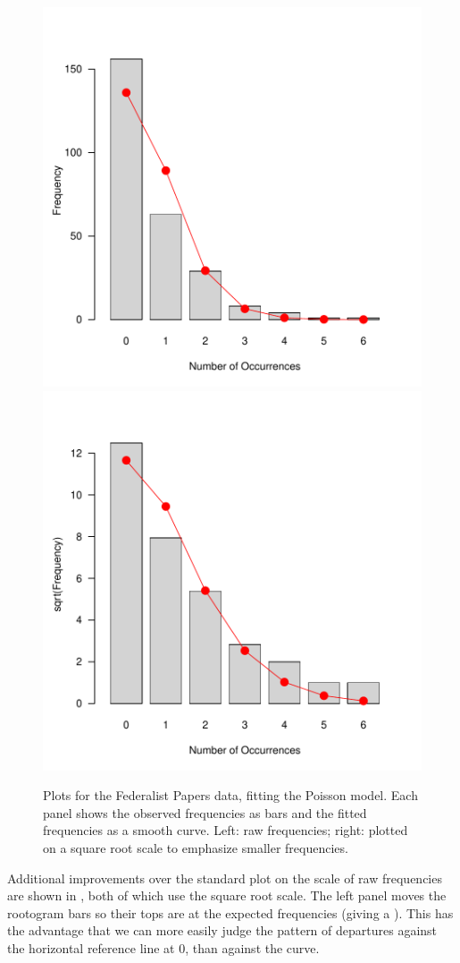 \documentclass[11pt]{book}
\renewenvironment{knitrout}{\small\renewcommand{\baselinestretch}{.85}}{} %
\begin{document}
\begin{knitrout}
\color{fgcolor}\begin{kframe}
\begin{alltt}
 \hlstd{=}\hlstd{,} \hlstd{=}\hlstd{)}
 \hlstd{=}\hlstd{)}
\end{alltt}
\end{kframe}\begin{figure}[!htbp]


\centerline{\includegraphics[width=.48\textwidth]{ch03/fig/Fed0-plots11} 
\includegraphics[width=.48\textwidth]{ch03/fig/Fed0-plots12} }

\caption[Plots for the Federalist Papers data, fitting the Poisson model]{Plots for the Federalist Papers data, fitting the Poisson model. Each panel shows the observed frequencies as bars and the fitted frequencies as a smooth curve. Left: raw frequencies; right: plotted on a square root scale to emphasize smaller frequencies.\label{fig:Fed0-plots1}}
\end{figure}


\end{knitrout}
Additional improvements over the standard plot on the scale of raw
frequencies are shown in , both of which 
use the square root scale.  The left panel 
moves the rootogram bars so their tops
are at the expected frequencies (giving a ).
This has the advantage that we can more easily judge the pattern
of departures against the horizontal reference line at 0, than
against the curve.
\end{document}
